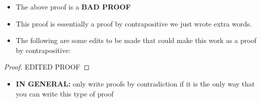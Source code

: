 \begin{itemize}
    \item The above proof is a \textbf{BAD PROOF}
    \item This proof is essentially a proof by contrapositive we just wrote extra words. 
    \item The following are some edits to be made that could make this work as a proof by contrapositive:
\end{itemize}

\begin{proof}
    EDITED PROOF
\end{proof}

\begin{itemize}
    \item \textbf{IN GENERAL:} only write proofs by contradiction if it is the only way that you can write this type of proof
\end{itemize}